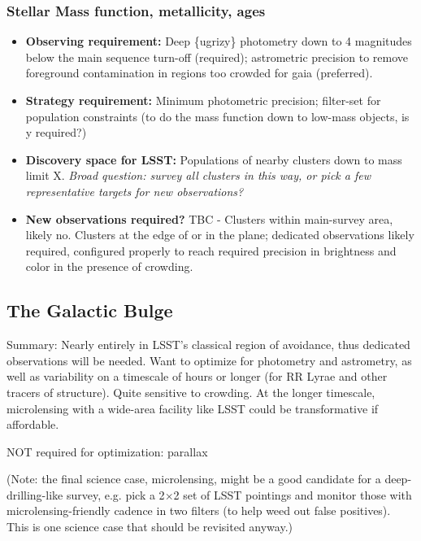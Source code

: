 \subsubsection{Stellar Mass function, metallicity, ages}
\vspace{-2mm}
\begin{itemize}
\item {\bf Observing requirement:} Deep \{ugrizy\} photometry down to 4 magnitudes below the main sequence turn-off (required); astrometric precision to remove foreground contamination in regions too crowded for gaia (preferred). 
\vspace{-2mm}

\item {\bf Strategy requirement:} Minimum photometric precision; filter-set for population constraints (to do the mass function down to low-mass objects, is y required?)
\vspace{-2mm}

\item {\bf Discovery space for LSST:} Populations of nearby clusters down to mass limit X. {\it Broad question: survey all clusters in this way, or pick a few representative targets for new observations?} 
\vspace{-2mm}

\item {\bf New observations required?} TBC - Clusters within main-survey area, likely no. Clusters at the edge of or in the plane; dedicated observations likely required, configured properly to reach required precision in brightness and color in the presence of crowding.
\vspace{-2mm}
\end{itemize}

\subsection{The Galactic Bulge}

Summary: Nearly entirely in LSST’s classical region of avoidance, thus
dedicated observations will be needed. Want to optimize for photometry
and astrometry, as well as variability on a timescale of hours or
longer (for RR Lyrae and other tracers of structure). Quite sensitive
to crowding. At the longer timescale, microlensing with a wide-area
facility like LSST could be transformative if affordable.

NOT required for optimization: parallax

(Note: the final science case, microlensing, might be a good candidate
for a deep-drilling-like survey, e.g. pick a 2$\times$2 set of LSST
pointings and monitor those with microlensing-friendly cadence in two
filters (to help weed out false positives). This is one science case
that should be revisited anyway.)


